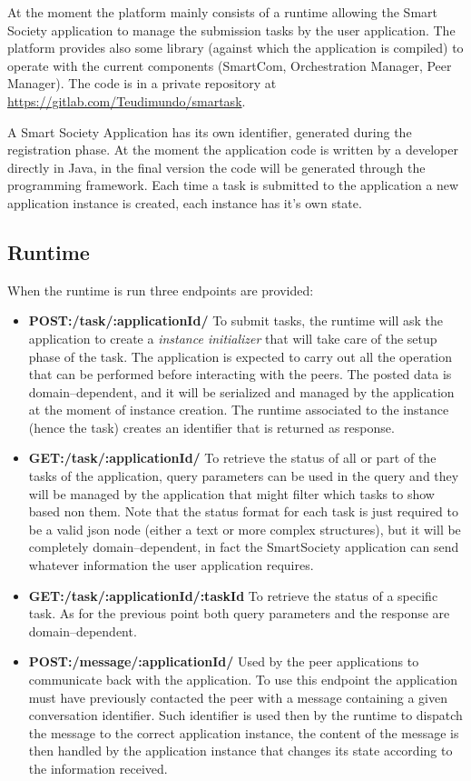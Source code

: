 At the moment the platform mainly consists of a runtime allowing the Smart Society application to manage the submission tasks by the user application. The platform provides also some library (against which the application is compiled) to operate with the current components (SmartCom, Orchestration Manager, Peer Manager). The code is in a private repository at \url{https://gitlab.com/Teudimundo/smartask}.

A Smart Society Application has its own identifier, generated during the registration phase. At the moment the application code is written by a developer directly in Java, in the final version the code will be generated through the programming framework. Each time a task is submitted to the application a new application instance is created, each instance has it's own state.

\subsection{Runtime}

When the runtime is run three endpoints are provided: 

\begin{itemize}
\item {\bf POST:/task/:applicationId/} To submit tasks, the runtime will ask the application to create a \textit{instance initializer} that will take care of the setup phase of the task. The application is expected to carry out all the operation that can be performed before interacting with the peers. The posted data is domain--dependent, and it will be serialized and managed by the application at the moment of instance creation. The runtime associated to the instance (hence the task) creates an identifier that is returned as response.

\item {\bf GET:/task/:applicationId/} To retrieve the status of all or part of the tasks of the application, query parameters can be used in the query and they will be managed by the application that might filter which tasks to show based non them. Note that the status format for each task is just required to be a valid json node (either a text or more complex structures), but it will be completely domain--dependent, in fact the SmartSociety application can send whatever information the user application requires.

\item {\bf GET:/task/:applicationId/:taskId} To retrieve the status of a specific task. As for the previous point both query parameters and the response are domain--dependent. 

\item {\bf POST:/message/:applicationId/} Used by the peer applications to communicate back with the application. To use this endpoint the application must have previously contacted the peer with a message containing a given conversation identifier. Such identifier is used then by the runtime to dispatch the message to the correct application instance, the content of the message is then handled by the application instance that  changes its state according to the information received.

\end{itemize}

